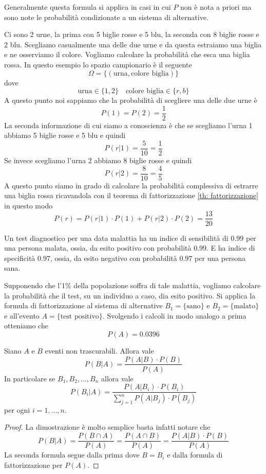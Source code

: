 Generalmente questa formula si applica in casi in cui $P$ non è nota a priori ma sono note le
probabilità condizionate a un sistema di alternative.

\begin{example}
	Ci sono 2 urne, la prima con 5 biglie rosse e 5 blu, la seconda con 8 biglie rosse e 2 blu.
	Scegliamo casualmente una delle due urne e da questa estraiamo una biglia e ne osserviamo il
	colore. Vogliamo calcolare la probabilità che esca una biglia rossa. In questo esempio lo
	spazio campionario è il seguente
	\[ \Omega = \{ (\text{urna}, \text{colore biglia}) \} \]
	dove
	\[ \text{urna} \in \{ 1, 2 \} \quad \text{colore biglia} \in \{ r, b \} \]
	A questo punto noi sappiamo che la probabilità di scegliere una delle due urne è
	\[ P(1) = P(2) = \frac{1}{2} \]
	La seconda informazione di cui siamo a conoscienza è che se scegliamo l'urna 1 abbiamo 5
	biglie rosse e 5 blu e quindi
	\[ P(r | 1) = \frac{5}{10} = \frac{1}{2} \]
	Se invece scegliamo l'urna 2 abbiamo 8 biglie rosse e quindi
	\[ P(r | 2) = \frac{8}{10} = \frac{4}{5} \]
	A questo punto siamo in grado di calcolare la probabilità complessiva di estrarre una biglia
	rossa ricavandola con il teorema di fattorizzazione \ref{th: fattorizzazione} in questo modo
	\[ P(r) = P(r | 1) \cdot P(1) + P(r | 2) \cdot P(2) = \frac{13}{20} \]
\end{example}

\begin{example}
	Un test diagnostico per una data malattia ha un indice di sensibilità di $0.99$ per una
	persona malata, ossia, da esito positivo con probabilità $0.99$. E ha indice di specificità
	$0.97$, ossia, da esito negativo con probabilità $0.97$ per una persona sana.

	Supponendo che l'1\% della popolazione soffra di tale malattia, vogliamo calcolare la
	probabilità che il test, su un individuo a caso, dia esito positivo. Si applica la formula di
	fattorizzazione al sistema di alternative $B_1 = \{ \text{sano} \}$ e
	$B_2 = \{ \text{malato} \}$ e all'evento $A = \{ \text{test positivo} \}$. Svolgendo i calcoli
	in modo analogo a prima otteniamo che
	\[ P(A) = 0.0396 \]
\end{example}

\begin{theorem}[Bayes]\label{th: bayes}
	Siano $A$ e $B$ eventi non trascurabili. Allora vale
	\[ P(B | A) = \frac{P(A | B) \cdot P(B)}{P(A)} \]
	In particolare se $B_1, B_2, ..., B_n$ allora vale
	\[
		P(B_i | A) = \frac{P(A | B_i) \cdot P(B_i)}{\displaystyle\sum_{j=1}^n P(A | B_j)
			\cdot P(B_j)}
	\]
	per ogni $i = 1, \dots, n$.
	\begin{proof}
		La dimostrazione è molto semplice basta infatti notare che
		\[
			P(B | A) = \frac{P(B \cap A)}{P(A)} =
			\frac{P(A \cap B)}{P(A)} = \frac{P(A | B) \cdot P(B)}{P(A)}
		\]
		La seconda formula segue dalla prima dove $B=B_i$ e dalla formula di fattorizzazione
		per $P(A)$.
	\end{proof}
\end{theorem}

